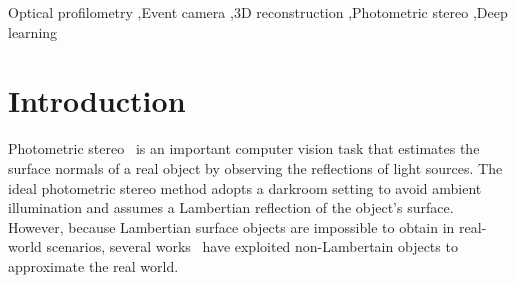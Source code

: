 \documentclass[preprint,12pt,authoryear]{elsarticle}
\begin{document}
\begin{frontmatter}




\begin{keyword}
Optical profilometry \sep Event camera \sep 3D reconstruction \sep Photometric stereo \sep Deep learning
\end{keyword}
\end{frontmatter}


\section{Introduction}
Photometric stereo~\citep{woodham1980photometric} is an important computer vision task that estimates the surface normals of a real object by observing the reflections of light sources. 
The ideal photometric stereo method adopts a darkroom setting to avoid ambient illumination and assumes a Lambertian reflection of the object's surface. 
However, because Lambertian surface objects are impossible to obtain in real-world scenarios, several works~\citep{ikehata2012robust,ikehata2014photometric,santo2017deep,ikehata2018cnn,chen2018ps,logothetis2021px,zheng2019spline} have exploited non-Lambertain objects to approximate the real world. %
\end{document}
